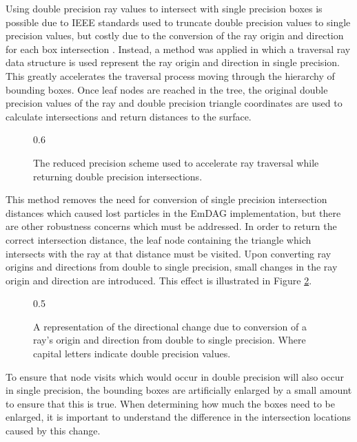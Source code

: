 Using double precision ray values to intersect with single precision boxes is
possible due to IEEE standards used to truncate double precision values to single
precision values, but costly due to the conversion of the ray origin and
direction for each box intersection \cite{IEEE_STD_2008}. Instead, a method was
applied in which a traversal ray data structure is used represent the ray origin
and direction in single precision. This greatly accelerates the traversal
process moving through the hierarchy of bounding boxes. Once leaf nodes are
reached in the tree, the original double precision values of the ray and double
precision triangle coordinates are used to calculate intersections and return
distances to the surface.

\begin{figure}[H]
  \centering
  {0.6\textwidth}
  \caption{The reduced precision scheme used to accelerate ray traversal while
    returning double precision intersections.}
  \label{fig:reduced_precision_scheme}
\end{figure}

This method removes the need for conversion of single precision intersection
distances which caused lost particles in the EmDAG implementation, but there are
other robustness concerns which must be addressed. In order to return the
correct intersection distance, the leaf node containing the triangle which
intersects with the ray at that distance must be visited. Upon converting ray
origins and directions from double to single precision, small changes in the ray
origin and direction are introduced. This effect is illustrated in Figure
\ref{fig:double_to_single_ray}.

\begin{figure}[H]
  \centering
  {0.5\textwidth}
  \caption{A representation of the directional change due to conversion of a
    ray's origin and direction from double to single precision. Where capital
    letters indicate double precision values.}
  \label{fig:double_to_single_ray}
\end{figure}

To ensure that node visits which would occur in double precision will also occur
in single precision, the bounding boxes are artificially enlarged by a small
amount to ensure that this is true. When determining how much the boxes need to
be enlarged, it is important to understand the difference in the intersection
locations caused by this change.

